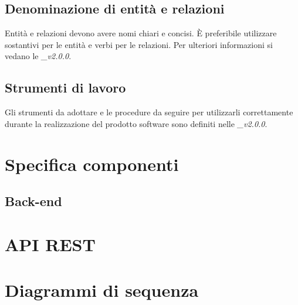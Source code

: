 \documentclass[12pt,a4paper]{article}
\begin{document}

\subsection{Denominazione di entità e relazioni}
Entità e relazioni devono avere nomi chiari e concisi. È preferibile utilizzare sostantivi
per le entità e verbi per le relazioni. Per ulteriori informazioni si vedano
le \textit{\NdP\_v2.0.0}.

\subsection{Strumenti di lavoro}
Gli strumenti da adottare e le procedure da seguire per utilizzarli correttamente durante la realizzazione 
del prodotto software sono definiti nelle \textit{\NdP\_v2.0.0}.

\newpage
\section{Specifica componenti}

\subsection{Back-end}

\section{API REST}

\newpage

\section{Diagrammi di sequenza}
\end{document}
